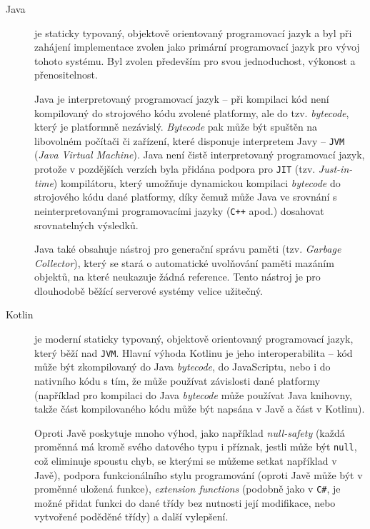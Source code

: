 \begin{description}
    \item[Java] je staticky typovaný, objektově orientovaný programovací jazyk a byl při zahájení implementace zvolen jako primární programovací jazyk pro vývoj tohoto systému. Byl zvolen především pro svou jednoduchost, výkonost a přenositelnost. 
    
    Java je interpretovaný programovací jazyk -- při kompilaci kód není kompilovaný do strojového kódu zvolené platformy, ale do tzv. \textit{bytecode}, který je platformně nezávislý. \textit{Bytecode} pak může být spuštěn na libovolném počítači či zařízení, které disponuje interpretem Javy -- \texttt{JVM} (\textit{Java Virtual Machine}). Java není čistě interpretovaný programovací jazyk, protože v pozdějších verzích byla přidána podpora pro \texttt{JIT} (tzv. \textit{Just-in-time}) kompilátoru, který umožňuje dynamickou kompilaci \textit{bytecode} do strojového kódu dané platformy, díky čemuž může Java ve srovnání s neinterpretovanými programovacími jazyky (\texttt{C++} apod.) dosahovat srovnatelných výsledků.
    
    Java také obsahuje nástroj pro generační správu paměti (tzv. \textit{Garbage Collector}), který se stará o automatické uvolňování paměti mazáním objektů, na které neukazuje žádná reference. Tento nástroj je pro dlouhodobě běžící serverové systémy velice užitečný.

    \item[Kotlin]\label{chap:arch:technologie:kotlin} je moderní staticky typovaný, objektově orientovaný programovací jazyk, který běží nad \texttt{JVM}. Hlavní výhoda Kotlinu je jeho interoperabilita -- kód může být zkompilovaný do Java \textit{bytecode}, do JavaScriptu, nebo i do nativního kódu s tím, že může používat závislosti dané platformy (například pro kompilaci do Java \textit{bytecode} může používat Java knihovny, takže část kompilovaného kódu může být napsána v Javě a část v Kotlinu).

    Oproti Javě poskytuje mnoho výhod, jako například \textit{null-safety} (každá proměnná má kromě svého datového typu i příznak, jestli může být \texttt{null}, což eliminuje spoustu chyb, se kterými se můžeme setkat například v Javě), podpora funkcionálního stylu programování (oproti Javě může být v proměnné uložená funkce), \textit{extension functions} (podobně jako v \texttt{C\#}, je možné přidat funkci do dané třídy bez nutnosti její modifikace, nebo vytvořené poděděné třídy) a další vylepšení. 
    

\end{description}
